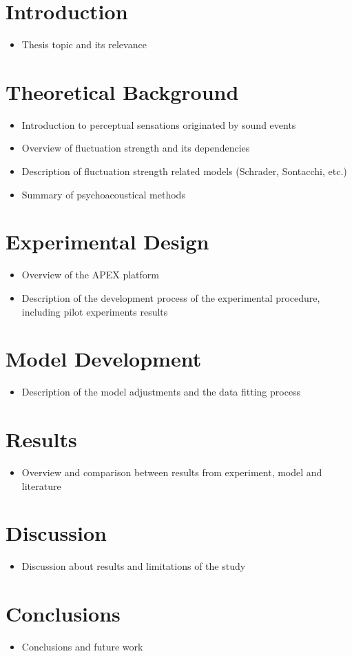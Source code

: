 \documentclass{article}
\begin{document}

\section{Introduction}
\begin{itemize}
  \item Thesis topic and its relevance
\end{itemize}

\section{Theoretical Background}
\begin{itemize}
  \item Introduction to perceptual sensations originated by sound events
  \item Overview of fluctuation strength and its dependencies
  \item Description of fluctuation strength related models (Schrader,
    Sontacchi, etc.)
  \item Summary of psychoacoustical methods
\end{itemize}

\section{Experimental Design}
\begin{itemize}
  \item Overview of the APEX platform
  \item Description of the development process of the experimental procedure,
    including pilot experiments results
\end{itemize}

\section{Model Development}
\begin{itemize}
  \item Description of the model adjustments and the data fitting process
\end{itemize}

\section{Results}
\begin{itemize}
  \item Overview and comparison between results from experiment, model and
    literature
\end{itemize}

\section{Discussion}
\begin{itemize}
  \item Discussion about results and limitations of the study
\end{itemize}

\section{Conclusions}
\begin{itemize}
  \item Conclusions and future work
\end{itemize}
\end{document}
